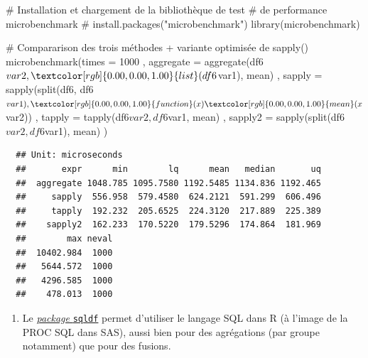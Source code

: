 \documentclass[12pt,twosided, notitlepage]{book}
\newenvironment{Shaded}{}{}
\newcommand{\CommentTok}[1]{\textcolor[rgb]{0.00,0.50,0.00}{#1}}
\newcommand{\ControlFlowTok}[1]{\textcolor[rgb]{0.00,0.00,1.00}{#1}}
\newcommand{\DataTypeTok}[1]{#1}
\newcommand{\DecValTok}[1]{#1}
\newcommand{\KeywordTok}[1]{\textcolor[rgb]{0.00,0.00,1.00}{#1}}
\newcommand{\NormalTok}[1]{#1}
\newcommand{\OperatorTok}[1]{#1}
\providecommand{\tightlist}{%
  \setlength{\itemsep}{0pt}\setlength{\parskip}{0pt}}
\renewenvironment{Shaded}{\begin{snugshade}}{\end{snugshade}}
\begin{document}
\begin{Shaded}
\begin{Highlighting}[]
\CommentTok{# Installation et chargement de la bibliothèque de test }
\CommentTok{# de performance microbenchmark}
\CommentTok{# install.packages("microbenchmark")}
\KeywordTok{library}\NormalTok{(microbenchmark)}

\CommentTok{# Compararison des trois méthodes + variante optimisée de sapply()}
\KeywordTok{microbenchmark}\NormalTok{(}\DataTypeTok{times =} \DecValTok{1000}
\NormalTok{  , }\DataTypeTok{aggregate =} \KeywordTok{aggregate}\NormalTok{(df6}\OperatorTok{$}\NormalTok{var2, }\KeywordTok{list}\NormalTok{(df6}\OperatorTok{$}\NormalTok{var1), mean)}
\NormalTok{  , }\DataTypeTok{sapply =} \KeywordTok{sapply}\NormalTok{(}\KeywordTok{split}\NormalTok{(df6, df6}\OperatorTok{$}\NormalTok{var1), }\ControlFlowTok{function}\NormalTok{(x) }\KeywordTok{mean}\NormalTok{(x}\OperatorTok{$}\NormalTok{var2))}
\NormalTok{  , }\DataTypeTok{tapply =} \KeywordTok{tapply}\NormalTok{(df6}\OperatorTok{$}\NormalTok{var2, df6}\OperatorTok{$}\NormalTok{var1, mean)}
\NormalTok{  , }\DataTypeTok{sapply2 =} \KeywordTok{sapply}\NormalTok{(}\KeywordTok{split}\NormalTok{(df6}\OperatorTok{$}\NormalTok{var2, df6}\OperatorTok{$}\NormalTok{var1), mean)}
\NormalTok{)}
\end{Highlighting}
\end{Shaded}

\begin{verbatim}
  ## Unit: microseconds
  ##       expr      min        lq      mean   median       uq
  ##  aggregate 1048.785 1095.7580 1192.5485 1134.836 1192.465
  ##     sapply  556.958  579.4580  624.2121  591.299  606.496
  ##     tapply  192.232  205.6525  224.3120  217.889  225.389
  ##    sapply2  162.233  170.5220  179.5296  174.864  181.969
  ##        max neval
  ##  10402.984  1000
  ##   5644.572  1000
  ##   4296.585  1000
  ##    478.013  1000
\end{verbatim}

\begin{enumerate}
\def\labelenumi{\arabic{enumi}.}
\setcounter{enumi}{1}
\tightlist
\item
  Le
  \href{http://www.gettinggeneticsdone.com/2010/05/use-sql-queries-to-manipulate-data.html}{\emph{package}
  \texttt{sqldf}} permet d'utiliser le langage SQL dans R (à l'image de
  la PROC SQL dans SAS), aussi bien pour des agrégations (par groupe
  notamment) que pour des fusions.
\end{enumerate}
\end{document}
